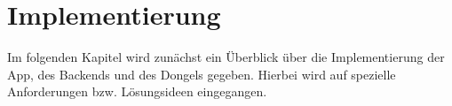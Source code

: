 \chapter{Implementierung}
\label{sec:implementation}

Im folgenden Kapitel wird zunächst ein Überblick über die Implementierung der App, des Backends und des Dongels gegeben. Hierbei wird auf spezielle Anforderungen bzw. Lösungsideen eingegangen. 





  

 
 
 
 
 
 
 
 